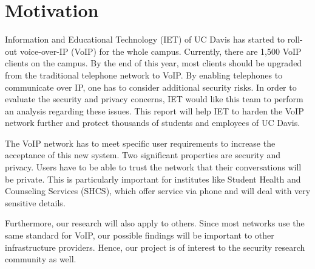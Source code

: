 \section{Motivation}

Information and Educational Technology (IET) of UC Davis has started to roll-out voice-over-IP (VoIP) for the whole campus. Currently, there are 1,500 VoIP clients on the campus. By the end of this year, most clients should be upgraded from the traditional telephone network to VoIP. By enabling telephones to communicate over IP, one has to consider additional security risks. In order to evaluate the security and privacy concerns, IET would like this team to perform an analysis regarding these issues. This report will help IET to harden the VoIP network further and protect thousands of students and employees of UC Davis.

The VoIP network has to meet specific user requirements to increase the acceptance of this new system. Two significant properties are security and privacy. Users have to be able to trust the network that their conversations will be private. This is particularly important for institutes like Student Health and Counseling Services (SHCS), which offer service via phone and will deal with very sensitive details. 

Furthermore, our research will also apply to others. Since most networks use the same standard for VoIP, our possible findings will be important to other infrastructure providers. Hence, our project is of interest to the security research community as well. 